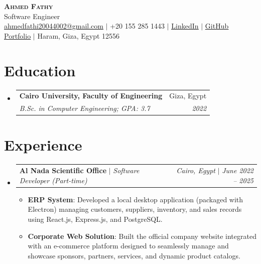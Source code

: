 \documentclass[letterpaper,10pt]{article}
\makeatletter
\newcommand{\resumeItem}[2]{\item\footnotesize{\textbf{#1}{: #2 \vspace{0pt}}}}
\newcommand{\resumeSubheading}[4]{
  \vspace{0pt}\item
    \begin{tabular*}{0.95\textwidth}{l@{\extracolsep{\fill}}r}
      \textbf{#1} & #2 \\
      \textit{\footnotesize#3} & \textit{\footnotesize #4} \\
    \end{tabular*}\vspace{0pt}
}
\newcommand{\resumeActivitySubheading}[4]{
  \vspace{0pt}\item
    \begin{tabular*}{0.95\textwidth}{l@{\extracolsep{\fill}}r}
      \textbf{#1} $|$ \textit{\footnotesize#3} & \textit{\footnotesize#2} $|$ \textit{\footnotesize #4} \\
    \end{tabular*}\vspace{0pt}
}
\newcommand{\resumeSubHeadingListStart}{\begin{itemize}[leftmargin=*]}
\newcommand{\resumeSubHeadingListEnd}{\end{itemize}}
\newcommand{\resumeItemListStart}{\begin{itemize}}
\newcommand{\resumeItemListEnd}{\end{itemize}\vspace{0pt}}
\newcommand{\resumeHeaderName}[1]{\LARGE \scshape #1}
\newcommand{\resumeHeaderMeta}[1]{\footnotesize #1}
\makeatother
\begin{document}
\begin{center}
    \textbf{\resumeHeaderName{Ahmed Fathy}} \\ \vspace{2pt}
    \resumeHeaderMeta{Software Engineer} \\
    \href{mailto:ahmedfathi20044002@gmail.com}{\underline{ahmedfathi20044002@gmail.com}} $|$
    +20 155 285 1443 $|$
    \href{https://www.linkedin.com/in/ahmedfathy-x1}{\underline{LinkedIn}} $|$
    \href{https://github.com/ahmedfathy0-0}{\underline{GitHub}} \\
    \href{https://www.mrfathi.tech/}{\underline{Portfolio}} $|$
    Haram, Giza, Egypt 12556
\end{center}


\section{Education}
  \resumeSubHeadingListStart
    \resumeSubheading
      {Cairo University, Faculty of Engineering}{Giza, Egypt}
      {B.Sc. in Computer Engineering;  GPA: 3.7}{2022}
  \resumeSubHeadingListEnd
\section{Experience}
  \resumeSubHeadingListStart
    \resumeActivitySubheading
      {Al Nada Scientific Office}{Cairo, Egypt}{Software Developer (Part-time)}{June 2022 -- 2025}
      \resumeItemListStart
        \resumeItem{ERP System}
          {Developed a local desktop application (packaged with Electron) managing customers, suppliers, inventory, and sales records using React.js, Express.js, and PostgreSQL.}
        \resumeItem{Corporate Web Solution}
          {Built the official company website integrated with an e-commerce platform designed to seamlessly manage and showcase sponsors, partners, services, and dynamic product catalogs.}
      \resumeItemListEnd
  \resumeSubHeadingListEnd
\end{document}
